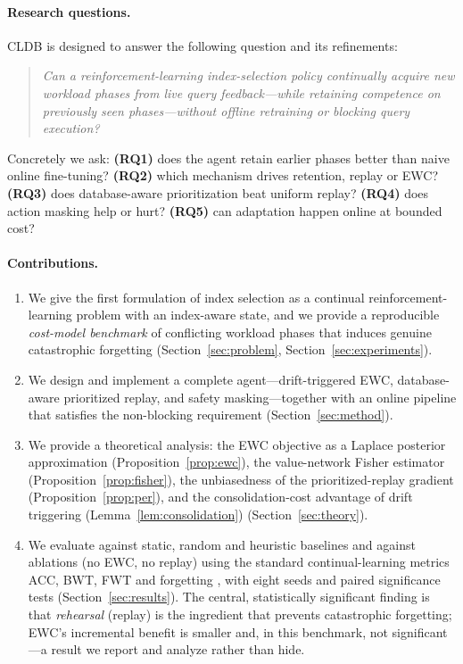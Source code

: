 \paragraph{Research questions.}
CLDB is designed to answer the following question and its refinements:
\begin{quote}
\emph{Can a reinforcement-learning index-selection policy continually acquire new
workload phases from live query feedback---while retaining competence on
previously seen phases---without offline retraining or blocking query
execution?}
\end{quote}
Concretely we ask: \textbf{(RQ1)} does the agent retain earlier phases better
than naive online fine-tuning? \textbf{(RQ2)} which mechanism drives retention,
replay or EWC? \textbf{(RQ3)} does database-aware prioritization beat uniform
replay? \textbf{(RQ4)} does action masking help or hurt? \textbf{(RQ5)} can
adaptation happen online at bounded cost?

\paragraph{Contributions.}
\begin{enumerate}
  \item We give the first formulation of index selection as a continual
    reinforcement-learning problem with an index-aware state, and we provide a
    reproducible \emph{cost-model benchmark} of conflicting workload phases that
    induces genuine catastrophic forgetting (Section~\ref{sec:problem},
    Section~\ref{sec:experiments}).
  \item We design and implement a complete agent---drift-triggered EWC,
    database-aware prioritized replay, and safety masking---together with an
    online pipeline that satisfies the non-blocking requirement
    (Section~\ref{sec:method}).
  \item We provide a theoretical analysis: the EWC objective as a Laplace
    posterior approximation (Proposition~\ref{prop:ewc}), the value-network
    Fisher estimator (Proposition~\ref{prop:fisher}), the unbiasedness of the
    prioritized-replay gradient (Proposition~\ref{prop:per}), and the
    consolidation-cost advantage of drift triggering
    (Lemma~\ref{lem:consolidation}) (Section~\ref{sec:theory}).
  \item We evaluate against static, random and heuristic baselines and against
    ablations (no EWC, no replay) using the standard continual-learning metrics
    ACC, BWT, FWT and forgetting \citep{lopezpaz2017gem}, with eight seeds and
    paired significance tests (Section~\ref{sec:results}). The central,
    statistically significant finding is that \emph{rehearsal} (replay) is the
    ingredient that prevents catastrophic forgetting; EWC's incremental benefit is
    smaller and, in this benchmark, not significant---a result we report and
    analyze rather than hide.
\end{enumerate}

